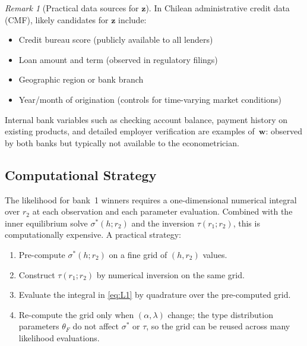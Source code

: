 \documentclass[12pt]{article}
\theoremstyle{plain}
\theoremstyle{plain}
\theoremstyle{definition}  %
\theoremstyle{remark}  %
\newtheorem{remark}[thm]{Remark}  %
\begin{document}
\begin{remark}[Practical data sources for $\mathbf{z}$]\label{rem:data}
In Chilean administrative credit data (CMF), likely candidates for $\mathbf{z}$ include:
\begin{itemize}
    \item Credit bureau score (publicly available to all lenders)
    \item Loan amount and term (observed in regulatory filings)
    \item Geographic region or bank branch
    \item Year/month of origination (controls for time-varying market conditions)
\end{itemize}
Internal bank variables such as checking account balance, payment history on existing products, and detailed employer verification are examples of~$\mathbf{w}$: observed by both banks but typically not available to the econometrician.
\end{remark}

\subsection{Computational Strategy}\label{sec:computation}

The likelihood for bank~1 winners requires a one-dimensional numerical integral over $r_2$ at each observation and each parameter evaluation. Combined with the inner equilibrium solve $\sigma^*(h; r_2)$ and the inversion $\tau(r_1; r_2)$, this is computationally expensive. A practical strategy:
\begin{enumerate}
    \item Pre-compute $\sigma^*(h; r_2)$ on a fine grid of $(h, r_2)$ values.
    \item Construct $\tau(r_1; r_2)$ by numerical inversion on the same grid.
    \item Evaluate the integral in \eqref{eq:L1} by quadrature over the pre-computed grid.
    \item Re-compute the grid only when $(\alpha, \lambda)$ change; the type distribution parameters $\theta_F$ do not affect $\sigma^*$ or $\tau$, so the grid can be reused across many likelihood evaluations.
\end{enumerate}


\end{document}
